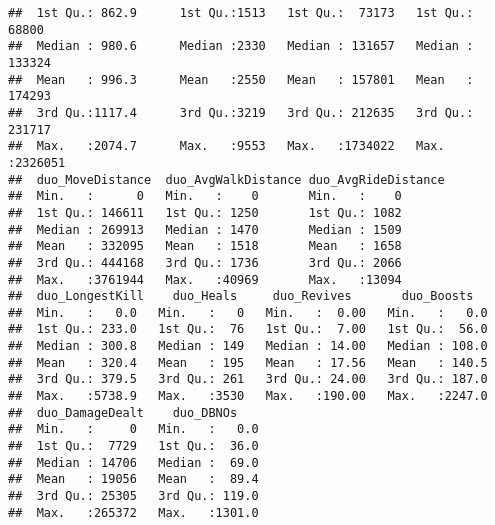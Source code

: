 \documentclass[]{article}
\begin{document}
\begin{verbatim}
##  1st Qu.: 862.9      1st Qu.:1513   1st Qu.:  73173   1st Qu.:  68800  
##  Median : 980.6      Median :2330   Median : 131657   Median : 133324  
##  Mean   : 996.3      Mean   :2550   Mean   : 157801   Mean   : 174293  
##  3rd Qu.:1117.4      3rd Qu.:3219   3rd Qu.: 212635   3rd Qu.: 231717  
##  Max.   :2074.7      Max.   :9553   Max.   :1734022   Max.   :2326051  
##  duo_MoveDistance  duo_AvgWalkDistance duo_AvgRideDistance
##  Min.   :      0   Min.   :    0       Min.   :    0      
##  1st Qu.: 146611   1st Qu.: 1250       1st Qu.: 1082      
##  Median : 269913   Median : 1470       Median : 1509      
##  Mean   : 332095   Mean   : 1518       Mean   : 1658      
##  3rd Qu.: 444168   3rd Qu.: 1736       3rd Qu.: 2066      
##  Max.   :3761944   Max.   :40969       Max.   :13094      
##  duo_LongestKill    duo_Heals     duo_Revives       duo_Boosts    
##  Min.   :   0.0   Min.   :   0   Min.   :  0.00   Min.   :   0.0  
##  1st Qu.: 233.0   1st Qu.:  76   1st Qu.:  7.00   1st Qu.:  56.0  
##  Median : 300.8   Median : 149   Median : 14.00   Median : 108.0  
##  Mean   : 320.4   Mean   : 195   Mean   : 17.56   Mean   : 140.5  
##  3rd Qu.: 379.5   3rd Qu.: 261   3rd Qu.: 24.00   3rd Qu.: 187.0  
##  Max.   :5738.9   Max.   :3530   Max.   :190.00   Max.   :2247.0  
##  duo_DamageDealt    duo_DBNOs     
##  Min.   :     0   Min.   :   0.0  
##  1st Qu.:  7729   1st Qu.:  36.0  
##  Median : 14706   Median :  69.0  
##  Mean   : 19056   Mean   :  89.4  
##  3rd Qu.: 25305   3rd Qu.: 119.0  
##  Max.   :265372   Max.   :1301.0
\end{verbatim}
\end{document}
